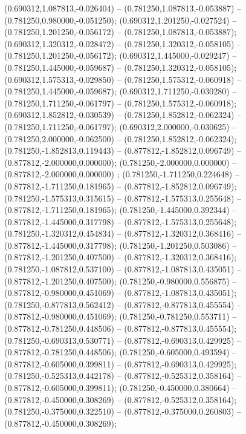  (0.690312,1.087813,-0.026404) -- (0.781250,1.087813,-0.053887) -- (0.781250,0.980000,-0.051250);
 (0.690312,1.201250,-0.027524) -- (0.781250,1.201250,-0.056172) -- (0.781250,1.087813,-0.053887);
 (0.690312,1.320312,-0.028472) -- (0.781250,1.320312,-0.058105) -- (0.781250,1.201250,-0.056172);
 (0.690312,1.445000,-0.029247) -- (0.781250,1.445000,-0.059687) -- (0.781250,1.320312,-0.058105);
 (0.690312,1.575313,-0.029850) -- (0.781250,1.575312,-0.060918) -- (0.781250,1.445000,-0.059687);
 (0.690312,1.711250,-0.030280) -- (0.781250,1.711250,-0.061797) -- (0.781250,1.575312,-0.060918);
 (0.690312,1.852812,-0.030539) -- (0.781250,1.852812,-0.062324) -- (0.781250,1.711250,-0.061797);
 (0.690312,2.000000,-0.030625) -- (0.781250,2.000000,-0.062500) -- (0.781250,1.852812,-0.062324);
 (0.781250,-1.852813,0.119443) -- (0.877812,-1.852812,0.096749) -- (0.877812,-2.000000,0.000000);
 (0.781250,-2.000000,0.000000) -- (0.877812,-2.000000,0.000000) ;
 (0.781250,-1.711250,0.224648) -- (0.877812,-1.711250,0.181965) -- (0.877812,-1.852812,0.096749);
 (0.781250,-1.575313,0.315615) -- (0.877812,-1.575313,0.255648) -- (0.877812,-1.711250,0.181965);
 (0.781250,-1.445000,0.392344) -- (0.877812,-1.445000,0.317798) -- (0.877812,-1.575313,0.255648);
 (0.781250,-1.320312,0.454834) -- (0.877812,-1.320312,0.368416) -- (0.877812,-1.445000,0.317798);
 (0.781250,-1.201250,0.503086) -- (0.877812,-1.201250,0.407500) -- (0.877812,-1.320312,0.368416);
 (0.781250,-1.087812,0.537100) -- (0.877812,-1.087813,0.435051) -- (0.877812,-1.201250,0.407500);
 (0.781250,-0.980000,0.556875) -- (0.877812,-0.980000,0.451069) -- (0.877812,-1.087813,0.435051);
 (0.781250,-0.877813,0.562412) -- (0.877812,-0.877813,0.455554) -- (0.877812,-0.980000,0.451069);
 (0.781250,-0.781250,0.553711) -- (0.877812,-0.781250,0.448506) -- (0.877812,-0.877813,0.455554);
 (0.781250,-0.690313,0.530771) -- (0.877812,-0.690313,0.429925) -- (0.877812,-0.781250,0.448506);
 (0.781250,-0.605000,0.493594) -- (0.877812,-0.605000,0.399811) -- (0.877812,-0.690313,0.429925);
 (0.781250,-0.525313,0.442178) -- (0.877812,-0.525312,0.358164) -- (0.877812,-0.605000,0.399811);
 (0.781250,-0.450000,0.380664) -- (0.877812,-0.450000,0.308269) -- (0.877812,-0.525312,0.358164);
 (0.781250,-0.375000,0.322510) -- (0.877812,-0.375000,0.260803) -- (0.877812,-0.450000,0.308269);
